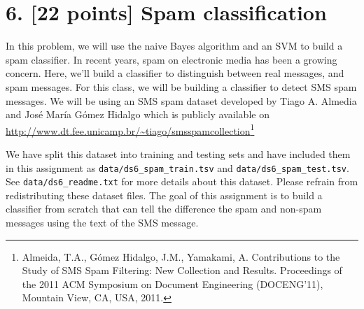 \documentclass[11pt]{article}
\newcommand{\problem}[2]{\clearpage\section*{#1. #2}}
\newcommand{\code}[1]{\nolinkurl{#1}}
\begin{document}
\problem{6}{[22 points] Spam classification}
In this problem, we will use the naive Bayes algorithm and an SVM to build a spam classifier. In recent years, spam on electronic media has been a growing concern. Here, we'll build a classifier to distinguish between real messages, and spam messages. For this class, we will be building a classifier to detect SMS spam messages. We will be using an SMS spam dataset developed by Tiago A. Almedia and Jos\'e Mar\'ia G\'omez Hidalgo which is publicly available on \url{http://www.dt.fee.unicamp.br/~tiago/smsspamcollection}\footnote{Almeida, T.A., G\'omez Hidalgo, J.M., Yamakami, A. Contributions to the Study of SMS Spam Filtering: New Collection and Results. Proceedings of the 2011 ACM Symposium on Document Engineering (DOCENG'11), Mountain View, CA, USA, 2011.}

We have split this dataset into training and testing sets and have included them in this assignment as \code{data/ds6_spam_train.tsv} and \code{data/ds6_spam_test.tsv}. See \code{data/ds6_readme.txt} for more details about this dataset. Please refrain from redistributing these dataset files. The goal of this assignment is to build a classifier from scratch that can tell the difference the spam and non-spam messages using the text of the SMS message.
\end{document}
